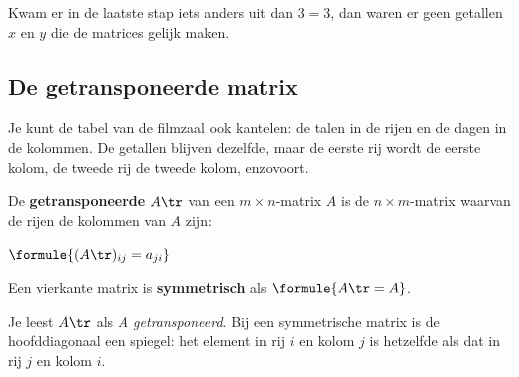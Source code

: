 
Kwam er in de laatste stap iets anders uit dan $3 = 3$, dan waren er geen getallen $x$ en $y$ die de matrices gelijk maken.

\begin{oefeningen}
\end{oefeningen}

\subsection{De getransponeerde matrix}

Je kunt de tabel van de filmzaal ook kantelen: de talen in de rijen en de dagen in de kolommen. De getallen blijven dezelfde, maar de eerste rij wordt de eerste kolom, de tweede rij de tweede kolom, enzovoort.

\begin{theorie}
De \textbf{\textcolor{accent}{getransponeerde}} $A\tr$ van een $m \times n$-matrix $A$ is de $n \times m$-matrix waarvan de rijen de kolommen van $A$ zijn:

\vspace{1mm}
\qquad $\formule{(A\tr)_{ij} = a_{ji}}$

\vspace{1mm}
Een vierkante matrix is \textbf{\textcolor{accent}{symmetrisch}} als $\formule{A\tr = A}$.
\end{theorie}

Je leest $A\tr$ als \textit{A getransponeerd}. Bij een symmetrische matrix is de hoofddiagonaal een spiegel: het element in rij $i$ en kolom $j$ is hetzelfde als dat in rij $j$ en kolom $i$.

